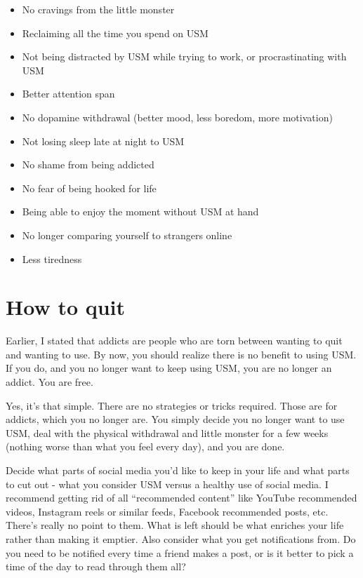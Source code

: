 \documentclass[
  openany]{book}
\providecommand{\tightlist}{%
  \setlength{\itemsep}{0pt}\setlength{\parskip}{0pt}}
\begin{document}
\begin{itemize}
\tightlist
\item
  No cravings from the little monster
\item
  Reclaiming all the time you spend on USM
\item
  Not being distracted by USM while trying to work, or procrastinating with USM
\item
  Better attention span
\item
  No dopamine withdrawal (better mood, less boredom, more motivation)
\item
  Not losing sleep late at night to USM
\item
  No shame from being addicted
\item
  No fear of being hooked for life
\item
  Being able to enjoy the moment without USM at hand
\item
  No longer comparing yourself to strangers online
\item
  Less tiredness
\end{itemize}

\chapter{How to quit}\label{how-to-quit}

Earlier, I stated that addicts are people who are torn between wanting to quit and wanting to use. By now, you should realize there is no benefit to using USM. If you do, and you no longer want to keep using USM, you are no longer an addict. You are free.

Yes, it's that simple. There are no strategies or tricks required. Those are for addicts, which you no longer are. You simply decide you no longer want to use USM, deal with the physical withdrawal and little monster for a few weeks (nothing worse than what you feel every day), and you are done.

Decide what parts of social media you'd like to keep in your life and what parts to cut out - what you consider USM versus a healthy use of social media. I recommend getting rid of all ``recommended content'' like YouTube recommended videos, Instagram reels or similar feeds, Facebook recommended posts, etc. There's really no point to them. What is left should be what enriches your life rather than making it emptier. Also consider what you get notifications from. Do you need to be notified every time a friend makes a post, or is it better to pick a time of the day to read through them all?
\end{document}
